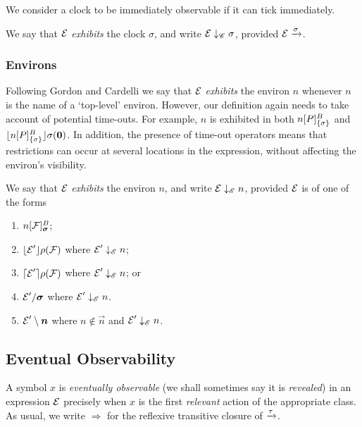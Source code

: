 \documentclass[orivec,envcountsame]{llncs}
\newcommand{\Exhibits}[1]{\mathrel{\downarrow_{#1}}}
\newcommand{\ExhibitsC}{\Exhibits{\mathscr{C}}}
\newcommand{\ExhibitsE}{\Exhibits{\mathscr{E}}}
\newcommand{\Does}[1]{\xderives{#1}}
\newcommand{\DoesTaus}{\mathrel{\Rightarrow}}
\begin{document}
We consider a clock to be immediately observable if it can tick immediately.

\begin{definition}
We say that $\text{$\mathcal{E}$}$ \emph{exhibits} the clock $\sigma$, and write $\expr \ExhibitsC \sigma$, provided $\expr \Does{\sigma}$.
\end{definition}

\subsubsection{Environs} 

Following Gordon and Cardelli \cite{GC99} we say that $\text{$\mathcal{E}$}$ \emph{exhibits}
the environ $n$ whenever $n$ is the name of a `top-level' environ. However, our
definition again needs to take account of potential time-outs. For example, $n$
is exhibited in both ${n}[ P ]^{B}_{\{\sigma\}}$ and
$\lfloor{{n}[ P ]^{B}_{\{\sigma\}}}\rfloor {\sigma} ({\textbf{0}})$. In addition, the presence of time-out operators means that restrictions can occur at several locations in the expression, without affecting the environ's visibility.

\begin{definition}
We say that $\text{$\mathcal{E}$}$ \emph{exhibits} the environ $n$, and write $\expr \ExhibitsE
n$, provided $\text{$\mathcal{E}$}$ is of one of the forms 
\begin{enumerate}
\item 
    $\locv{n}{\exprb}{B}{\vec{\sigma}}$;
\item
    $\lfloor{ \text{$\mathcal{E}$}' }\rfloor {\rho} ({\text{$\mathcal{F}$}})$ where $\expr' \ExhibitsE n$;
\item
    $\lceil{ \text{$\mathcal{E}$}' }\rceil {\rho} ({\text{$\mathcal{F}$}})$ where $\expr' \ExhibitsE n$; or
\item
    $\expr' \hide{\vec{\sigma}}$ where $\expr' \ExhibitsE n$.
\item
    $\expr' \res{ \vec{n} }$ where $n \not\in \vec{n}$ and $\expr' \ExhibitsE n$.
\end{enumerate}
\end{definition}


\subsection{Eventual Observability}
\label{sec:eventual-observability}

A symbol $x$ is \emph{eventually observable} (we shall sometimes say it is \emph{revealed}) in an expression $\text{$\mathcal{E}$}$ precisely when $x$ is the first \emph{relevant} action of the appropriate class. As usual, we write $\DoesTaus$ for the reflexive transitive closure of $\Does{\tau}$.
\end{document}
